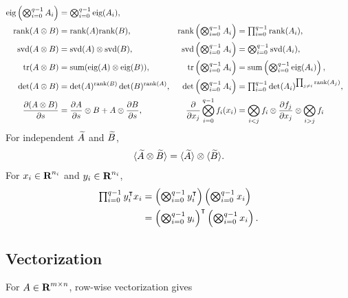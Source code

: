 \documentclass{article}
\begin{document}
\begin{align*}
            \text{eig}\left(\textstyle\bigotimes_{i=0}^{q-1} A_i\right)
            &=\textstyle\bigotimes_{i=0}^{q-1} \text{eig}(A_i),\\
        \text{rank}(A\otimes B) & = \text{rank}(A)\text{rank}(B),&    
            \text{rank}\left(\textstyle\bigotimes_{i=0}^{q-1} A_i\right)
            &=\textstyle\prod_{i=0}^{q-1} \text{rank}(A_i),\\
        \text{svd}(A\otimes B) & = \text{svd}(A)\otimes\text{svd}(B),&    
            \text{svd}\left(\textstyle\bigotimes_{i=0}^{q-1} A_i\right)
            &=\textstyle\bigotimes_{i=0}^{q-1} \text{svd}(A_i),\\
        \text{tr}(A\otimes B)&=\text{sum} (\text{eig}(A)\otimes\text{eig}(B)),&    
            \text{tr}\left(\textstyle\bigotimes_{i=0}^{q-1} A_i\right)
            &=\text{sum}\left(\textstyle\bigotimes_{i=0}^{q-1} \text{eig}(A_i)\right),\\
        \det(A\otimes B)&=\det(A)^{\text{rank}(B)}\det(B)^{\text{rank}(A)},
            &\det\left(\textstyle\bigotimes_{i=0}^{q-1} A_i\right)
            &=\textstyle\prod_{i=0}^{q-1} \det(A_i)^{\prod_{j\neq i}\text{rank}(A_j)},\\
        \frac{\partial (A\otimes B)}{\partial s}&=\frac{\partial A}{\partial s}\otimes B + A\otimes \frac{\partial B}{\partial s},&
        \frac{\partial }{\partial x_j}\bigotimes_{i=0}^{q-1} f_i(x_i)&=\bigotimes_{i<j} f_i
        \otimes
        \frac{\partial f_j}{\partial x_j}
        \otimes 
        \bigotimes_{i>j} f_i
    \end{align*}
    For independent $\widetilde{A}$ and $\widetilde{B}$,
    \begin{align*}
        \langle\widetilde{A}\otimes\widetilde{B}\rangle = \langle\widetilde{A}\rangle\otimes\langle\widetilde{B}\rangle.
    \end{align*}
    For $x_i\in\textbf{R}^{n_i}$ and $y_i\in\textbf{R}^{n_i}$,
    \begin{align*}
        \textstyle\prod_{i=0}^{q-1} y_i^\intercal x_i 
        &=  \left(\textstyle\bigotimes_{i=0}^{q-1} y_i^\intercal\right)\left(\textstyle\bigotimes_{i=0}^{q-1} x_i\right)
        \\
        &= \left(\textstyle\bigotimes_{i=0}^{q-1} y_i\right)^\intercal\left(\textstyle\bigotimes_{i=0}^{q-1} x_i\right).
    \end{align*}

\subsection{Vectorization}

    For $A\in\textbf{R}^{m\times n}$, row-wise vectorization gives
\end{document}
